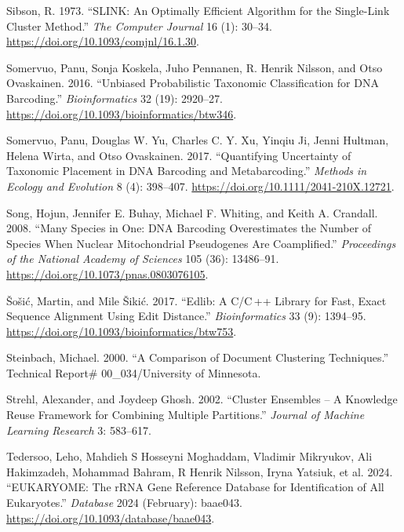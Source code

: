 \documentclass[
]{article}
\newlength{\cslhangindent}
\newenvironment{CSLReferences}[2] %
 {\begin{list}{}{%
  \setlength{\itemindent}{0pt}
  \setlength{\leftmargin}{0pt}
  \setlength{\parsep}{0pt}
  \ifodd #1
   \setlength{\leftmargin}{\cslhangindent}
   \setlength{\itemindent}{-1\cslhangindent}
  \fi
  \setlength{\itemsep}{#2\baselineskip}}}
 {\end{list}}
\begin{document}
\begin{CSLReferences}{1}{0}
Sibson, R. 1973. {``{SLINK}: {An} Optimally Efficient Algorithm for the Single-Link Cluster Method.''} \emph{The Computer Journal} 16 (1): 30--34. \url{https://doi.org/10.1093/comjnl/16.1.30}.

Somervuo, Panu, Sonja Koskela, Juho Pennanen, R. Henrik Nilsson, and Otso Ovaskainen. 2016. {``Unbiased Probabilistic Taxonomic Classification for {DNA} Barcoding.''} \emph{Bioinformatics} 32 (19): 2920--27. \url{https://doi.org/10.1093/bioinformatics/btw346}.

Somervuo, Panu, Douglas W. Yu, Charles C. Y. Xu, Yinqiu Ji, Jenni Hultman, Helena Wirta, and Otso Ovaskainen. 2017. {``Quantifying Uncertainty of Taxonomic Placement in {DNA} Barcoding and Metabarcoding.''} \emph{Methods in Ecology and Evolution} 8 (4): 398--407. \url{https://doi.org/10.1111/2041-210X.12721}.

Song, Hojun, Jennifer E. Buhay, Michael F. Whiting, and Keith A. Crandall. 2008. {``Many Species in One: {DNA} Barcoding Overestimates the Number of Species When Nuclear Mitochondrial Pseudogenes Are Coamplified.''} \emph{Proceedings of the National Academy of Sciences} 105 (36): 13486--91. \url{https://doi.org/10.1073/pnas.0803076105}.

Šošić, Martin, and Mile Šikić. 2017. {``Edlib: A {C}/{C} ++ Library for Fast, Exact Sequence Alignment Using Edit Distance.''} \emph{Bioinformatics} 33 (9): 1394--95. \url{https://doi.org/10.1093/bioinformatics/btw753}.

Steinbach, Michael. 2000. {``A Comparison of Document Clustering Techniques.''} Technical Report\# 00\_034/University of Minnesota.

Strehl, Alexander, and Joydeep Ghosh. 2002. {``Cluster {Ensembles} -- {A Knowledge Reuse Framework} for {Combining Multiple Partitions}.''} \emph{Journal of Machine Learning Research} 3: 583--617.

Tedersoo, Leho, Mahdieh S Hosseyni Moghaddam, Vladimir Mikryukov, Ali Hakimzadeh, Mohammad Bahram, R Henrik Nilsson, Iryna Yatsiuk, et al. 2024. {``{EUKARYOME}: The {rRNA} Gene Reference Database for Identification of All Eukaryotes.''} \emph{Database} 2024 (February): baae043. \url{https://doi.org/10.1093/database/baae043}.


\end{CSLReferences}
\end{document}
